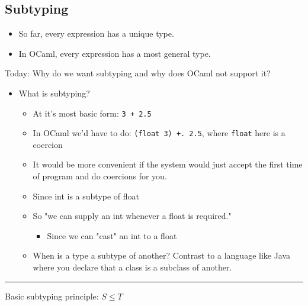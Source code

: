 \documentclass[11pt]{article}
\begin{document}
\subsection{Subtyping}
\label{sec:org30eb10e}
\begin{itemize}
\item So far, every expression has a unique type.
\item In OCaml, every expression has a most general type.
\end{itemize}
Today: Why do we want subtyping and why does OCaml not support it?
\begin{itemize}
\item What is subtyping?
\begin{itemize}
\item At it's most basic form: \texttt{3 + 2.5}
\item In OCaml we'd have to do: \texttt{(float 3) +. 2.5}, where \texttt{float} here is a coercion
\item It would be more convenient if the system would just accept the first time of program and do coercions for you.
\item Since int is a subtype of float
\item So "we can supply an int whenever a float is required."
\begin{itemize}
\item Since we can "cast" an int to a float
\end{itemize}
\item When is a type a subtype of another? Contrast to a language like Java where you declare that a class is a subclass of another.
\end{itemize}
\end{itemize}

\noindent\rule{\textwidth}{0.5pt}
Basic subtyping principle: \(S \leq T\)
\end{document}
